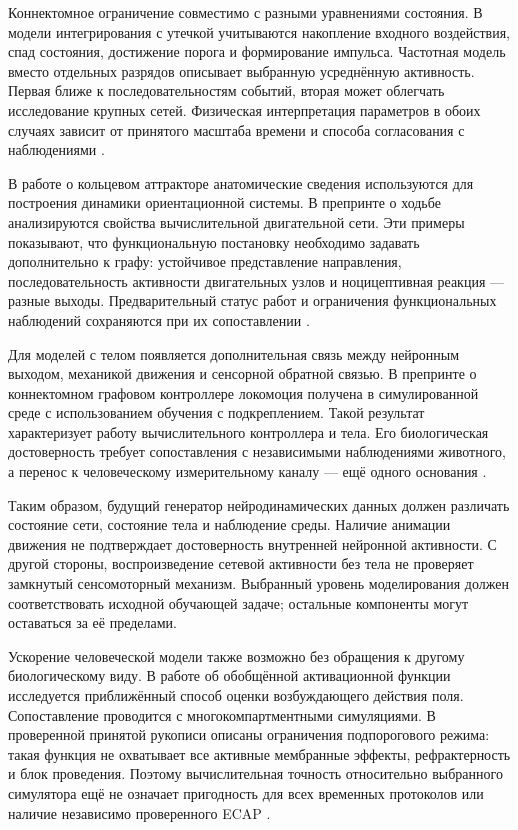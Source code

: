 Коннектомное ограничение совместимо с разными уравнениями состояния. В модели интегрирования с утечкой учитываются накопление входного воздействия, спад состояния, достижение порога и формирование импульса. Частотная модель вместо отдельных разрядов описывает выбранную усреднённую активность. Первая ближе к последовательностям событий, вторая может облегчать исследование крупных сетей. Физическая интерпретация параметров в обоих случаях зависит от принятого масштаба времени и способа согласования с наблюдениями \cite{s775,s212}.

В работе о кольцевом аттракторе анатомические сведения используются для построения динамики ориентационной системы. В препринте о ходьбе анализируются свойства вычислительной двигательной сети. Эти примеры показывают, что функциональную постановку необходимо задавать дополнительно к графу: устойчивое представление направления, последовательность активности двигательных узлов и ноцицептивная реакция --- разные выходы. Предварительный статус работ и ограничения функциональных наблюдений сохраняются при их сопоставлении \cite{s900,s909}.

Для моделей с телом появляется дополнительная связь между нейронным выходом, механикой движения и сенсорной обратной связью. В препринте о коннектомном графовом контроллере локомоция получена в симулированной среде с использованием обучения с подкреплением. Такой результат характеризует работу вычислительного контроллера и тела. Его биологическая достоверность требует сопоставления с независимыми наблюдениями животного, а перенос к человеческому измерительному каналу --- ещё одного основания \cite{s286}.

Таким образом, будущий генератор нейродинамических данных должен различать состояние сети, состояние тела и наблюдение среды. Наличие анимации движения не подтверждает достоверность внутренней нейронной активности. С другой стороны, воспроизведение сетевой активности без тела не проверяет замкнутый сенсомоторный механизм. Выбранный уровень моделирования должен соответствовать исходной обучающей задаче; остальные компоненты могут оставаться за её пределами.

Ускорение человеческой модели также возможно без обращения к другому биологическому виду. В работе об обобщённой активационной функции исследуется приближённый способ оценки возбуждающего действия поля. Сопоставление проводится с многокомпартментными симуляциями. В проверенной принятой рукописи описаны ограничения подпорогового режима: такая функция не охватывает все активные мембранные эффекты, рефрактерность и блок проведения. Поэтому вычислительная точность относительно выбранного симулятора ещё не означает пригодность для всех временных протоколов или наличие независимо проверенного ECAP \cite{s877}.

